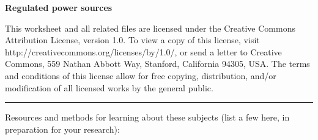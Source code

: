 
\centerline{\bf Regulated power sources} \bigskip 
 
This worksheet and all related files are licensed under the Creative Commons Attribution License, version 1.0.  To view a copy of this license, visit http://creativecommons.org/licenses/by/1.0/, or send a letter to Creative Commons, 559 Nathan Abbott Way, Stanford, California 94305, USA.  The terms and conditions of this license allow for free copying, distribution, and/or modification of all licensed works by the general public.

\bigskip 

\hrule

\vskip 10pt

Resources and methods for learning about these subjects (list a few here, in preparation for your research):

